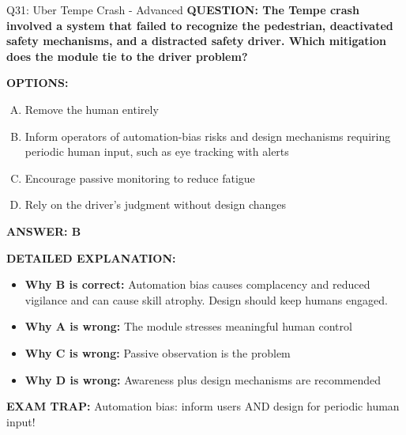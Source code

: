 \documentclass[8pt]{beamer}
\begin{document}
\begin{frame}[shrink=6]{Q31: Uber Tempe Crash - Advanced}
\fontsize{6.5}{7.5}\selectfont
\textbf{QUESTION: The Tempe crash involved a system that failed to recognize the pedestrian, deactivated safety mechanisms, and a distracted safety driver. Which mitigation does the module tie to the driver problem?}

\vspace{0.1cm}
\textbf{OPTIONS:}
\begin{enumerate}[A.]
\item Remove the human entirely
\item Inform operators of automation-bias risks and design mechanisms requiring periodic human input, such as eye tracking with alerts
\item Encourage passive monitoring to reduce fatigue
\item Rely on the driver's judgment without design changes
\end{enumerate}

\vspace{0.1cm}
\textcolor{myblue}{\textbf{ANSWER: B}}

\vspace{0.1cm}
\textbf{DETAILED EXPLANATION:}
\begin{itemize}
\item \textbf{Why B is correct:} Automation bias causes complacency and reduced vigilance and can cause skill atrophy. Design should keep humans engaged.
\item \textbf{Why A is wrong:} The module stresses meaningful human control
\item \textbf{Why C is wrong:} Passive observation is the problem
\item \textbf{Why D is wrong:} Awareness plus design mechanisms are recommended
\end{itemize}

\textcolor{myred}{\textbf{EXAM TRAP:}} Automation bias: inform users AND design for periodic human input!
\end{frame}
\end{document}
